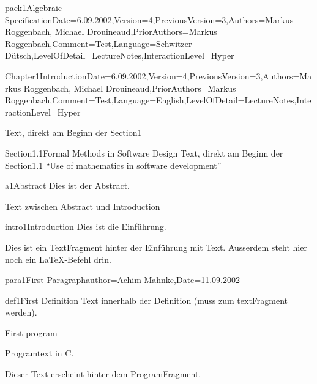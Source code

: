 \documentclass[landscape, slides, light]{mmiss2}
\begin{document}
\begin{Package}{pack1}{Algebraic
Specification}{Date=6.09.2002,Version=4,PreviousVersion=3,Authors={Markus
Roggenbach, Michael Drouineaud},PriorAuthors={Markus
Roggenbach},Comment=Test,Language=Schwitzer
D\"utsch,LevelOfDetail=LectureNotes,InteractionLevel=Hyper}


\begin{Section}{Chapter1}{Introduction}{Date=6.09.2002,Version=4,PreviousVersion=3,Authors={Markus
Roggenbach, Michael Drouineaud},PriorAuthors={Markus Roggenbach},Comment=Test,Language=English,LevelOfDetail=LectureNotes,InteractionLevel=Hyper}

Text, direkt am Beginn der Section1

 
\begin{Section}{Section1.1}{Formal Methods in Software Design}{}
Text, direkt am Beginn der Section1.1 
``Use of mathematics in software development''\\

\begin{Abstract}[]{a1}{Abstract}{}
Dies ist der Abstract.
\end{Abstract}

Text zwischen Abstract und Introduction

\begin{Introduction}[]{intro1}{Introduction}{}
Dies ist die Einf\"uhrung.
\end{Introduction}
\begin{TextFragment}
Dies ist ein TextFragment hinter der Einf\"uhrung mit
 Text. Ausserdem steht hier noch
ein \LaTeX{}-Befehl drin.
\end{TextFragment}
\begin{Paragraph}[]{para1}{First Paragraph}{author=Achim Mahnke,Date=11.09.2002}
\begin{Definition}[]{def1}{First Definition}{}
Text innerhalb der Definition (muss zum textFragment werden).

\begin{Program}[C]{}{First program}{}
\begin{ProgramFragment}[]{}{}{}
  Programtext in C.
\end{ProgramFragment}
Dieser Text erscheint hinter dem ProgramFragment.
\end{Program}
\end{Definition}
\end{Paragraph}
\end{Section}


\end{Section}
\end{Package}
\end{document}
